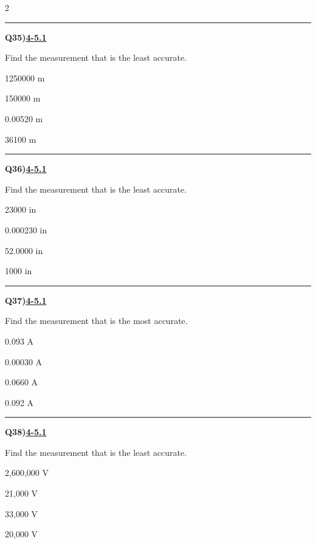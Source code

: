 \documentclass[11pt]{article}
\newenvironment{Qbox}[2]{%
  \par\medskip\noindent\begin{minipage}{\linewidth}%
  \hrule\medskip%
  \textbf{Q#1)}\hfill\textbf{\underline{#2}}\par\smallskip%
}{\par\end{minipage}\par\medskip}
\begin{document}
\begin{multicols}{2}
\begin{Qbox}{35}{4-5.1}
Find the measurement that is the least accurate.
\begin{choices}
  \item 1250000 m
  \item 150000 m
  \item 0.00520 m
  \item 36100 m
\end{choices}
\end{Qbox}

\begin{Qbox}{36}{4-5.1}
Find the measurement that is the least accurate.
\begin{choices}
  \item 23000 in
  \item 0.000230 in
  \item 52.0000 in
  \item 1000 in
\end{choices}
\end{Qbox}

\begin{Qbox}{37}{4-5.1}
Find the measurement that is the most accurate.
\begin{choices}
  \item 0.093 A
  \item 0.00030 A
  \item 0.0660 A
  \item 0.092 A
\end{choices}
\end{Qbox}

\begin{Qbox}{38}{4-5.1}
Find the measurement that is the least accurate.
\begin{choices}
  \item 2,600,000 V
  \item 21,000 V
  \item 33,000 V
  \item 20,000 V
\end{choices}
\end{Qbox}


\end{multicols}
\end{document}
